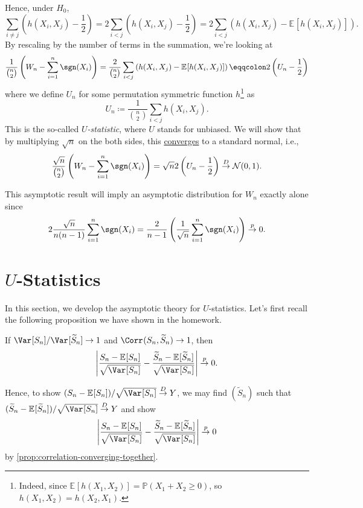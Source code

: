 Hence, under \(H_0\),
\[
	\sum_{i \neq j} \left( h(X_i, X_j) - \frac{1}{2} \right)
	= 2 \sum_{i < j} \left( h(X_i, X_j) - \frac{1}{2} \right)
	= 2 \sum_{i < j} \left( h(X_i, X_j) - \mathbb{E}_{}[h(X_i, X_j)] \right).
\]
By rescaling by the number of terms in the summation, we're looking at
\[
	\frac{1}{\binom{n}{2}} \left( W_n - \sum_{i=1}^{n} \sgn (X_i) \right)
	= \frac{2}{\binom{n}{2}} \sum_{i < j} \left( h(X_i, X_j) - \mathbb{E}_{}[h(X_i, X_j)] \right)
	\eqqcolon 2 \left( U_n - \frac{1}{2} \right)
\]
where we define \(U_n\) for some permutation symmetric function \(h\)\footnote{Indeed, since \(\mathbb{E}_{}[h(X_1, X_2)] = \mathbb{P} (X_1 + X_2 \geq 0)\), so \(h(X_1, X_2) = h(X_2, X_1)\).} as
\[
	U_n \coloneqq \frac{1}{\binom{n}{2}} \sum_{i < j} h(X_i, X_j).
\]
This is the so-called \emph{\(U\)-statistic}, where \(U\) stands for unbiased. We will show that by multiplying \(\sqrt{n} \) on the both sides, this \hyperref[def:converge-in-distribution]{converges} to a standard normal, i.e.,
\[
	\frac{\sqrt{n}}{\binom{n}{2}}  \left( W_n - \sum_{i=1}^{n} \sgn (X_i) \right)
	= \sqrt{n} 2 \left( U_n - \frac{1}{2} \right)
	\overset{D}{\to} \mathcal{N} (0, 1).
\]

\begin{note}
	This asymptotic result will imply an asymptotic distribution for \(W_n\) exactly alone since
	\[
		2 \frac{\sqrt{n} }{n(n-1)} \sum_{i=1}^{n} \sgn (X_i)
		= \frac{2}{n-1} \left( \frac{1}{\sqrt{n} } \sum_{i=1}^{n} \sgn (X_i) \right)
		\overset{p}{\to} 0.
	\]
\end{note}

\section{\(U\)-Statistics}
In this section, we develop the asymptotic theory for \(U\)-statistics. Let's first recall the following proposition we have shown in the homework.

\begin{proposition}\label{prop:correlation-converging-together}
	If \(\Var_{}[S_n] / \Var_{}[\widetilde{S} _n] \to 1\) and \(\Corr_{}(S_n, \widetilde{S} _n) \to 1\), then
	\[
		\left\vert \frac{S_n - \mathbb{E}_{}[S_n] }{\sqrt{\Var_{}[S_n] } } - \frac{\widetilde{S} _n - \mathbb{E}_{}[\widetilde{S} _n] }{\sqrt{\Var_{}[S_n] } } \right\vert
		\overset{p}{\to} 0.
	\]
\end{proposition}

Hence, to show \((S_n - \mathbb{E}_{}[S_n] ) / \sqrt{\Var_{}[S_n] } \overset{D}{\to} Y\), we may find \((\widetilde{S} _n)\) such that \((\widetilde{S} _n - \mathbb{E}_{}[\widetilde{S} _n]) / \sqrt{\Var_{}[S_n] } \overset{D}{\to} Y\) and show
\[
	\left\vert \frac{S_n - \mathbb{E}_{}[S_n] }{\sqrt{\Var_{}[S_n] } } - \frac{\widetilde{S} _n - \mathbb{E}_{}[\widetilde{S} _n] }{\sqrt{\Var_{}[S_n] } }\right\vert
	\overset{p}{\to} 0
\]
by \autoref{prop:correlation-converging-together}.